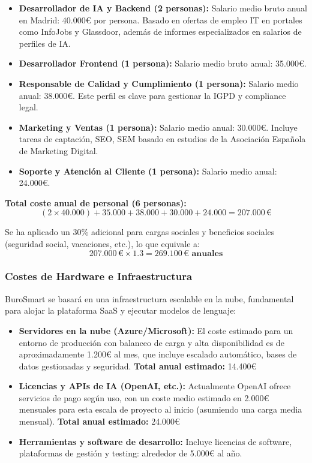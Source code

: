 \begin{itemize}
  \item \textbf{Desarrollador de IA y Backend (2 personas):} Salario medio bruto anual en Madrid: 40.000€ por persona. Basado en ofertas de empleo IT en portales como InfoJobs y Glassdoor, además de informes especializados en salarios de perfiles de IA.
  \item \textbf{Desarrollador Frontend (1 persona):} Salario medio bruto anual: 35.000€.
  \item \textbf{Responsable de Calidad y Cumplimiento (1 persona):} Salario medio anual: 38.000€. Este perfil es clave para gestionar la IGPD y compliance legal.
  \item \textbf{Marketing y Ventas (1 persona):} Salario medio anual: 30.000€. Incluye tareas de captación, SEO, SEM basado en estudios de la Asociación Española de Marketing Digital.
  \item \textbf{Soporte y Atención al Cliente (1 persona):} Salario medio anual: 24.000€.
\end{itemize}

\textbf{Total coste anual de personal (6 personas):}  
\[
(2 \times 40.000) + 35.000 + 38.000 + 30.000 + 24.000 = 207.000\,€
\]

Se ha aplicado un 30\% adicional para cargas sociales y beneficios sociales (seguridad social, vacaciones, etc.), lo que equivale a:  
\[
207.000\,€ \times 1.3 = \mathbf{269.100\,€ \text{ anuales}}
\]

\subsubsection{Costes de Hardware e Infraestructura}

BuroSmart se basará en una infraestructura escalable en la nube, fundamental para alojar la plataforma SaaS y ejecutar modelos de lenguaje:

\begin{itemize}
  \item \textbf{Servidores en la nube (Azure/Microsoft):}  
  El coste estimado para un entorno de producción con balanceo de carga y alta disponibilidad es de aproximadamente 1.200€ al mes, que incluye escalado automático, bases de datos gestionadas y seguridad.  
  \textbf{Total anual estimado:} 14.400€
  
  \item \textbf{Licencias y APIs de IA (OpenAI, etc.):}  
  Actualmente OpenAI ofrece servicios de pago según uso, con un coste medio estimado en 2.000€ mensuales para esta escala de proyecto al inicio (asumiendo una carga media mensual).  
  \textbf{Total anual estimado:} 24.000€
  
  \item \textbf{Herramientas y software de desarrollo:}  
  Incluye licencias de software, plataformas de gestión y testing: alrededor de 5.000€ al año.
\end{itemize}

